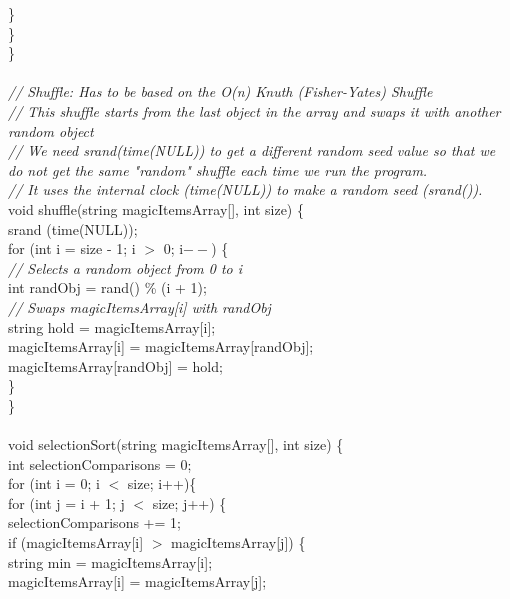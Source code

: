 \documentclass{article}
\begin{document}
\begin {linenumbers}
        \indent \indent \}\\
    \indent \}\\
\}\\
\\
\textit{// Shuffle: Has to be based on the O(n) Knuth (Fisher-Yates) Shuffle\\
// This shuffle starts from the last object in the array and swaps it with another random object\\
// We need srand(time(NULL)) to get a different random seed value so that we do not get the same "random" shuffle each time we run the program. \\
// It uses the internal clock (time(NULL)) to make a random seed (srand()).\\}
void shuffle(string magicItemsArray[], int size) \{\\
    \indent srand (time(NULL));\\
    \indent for (int i = size - 1; i $>$ 0; i$--$) \{\\
        \textit{\indent \indent // Selects a random object from 0 to i\\}
        \indent \indent int randObj = rand() \% (i + 1);\\
        \textit{\indent \indent // Swaps magicItemsArray[i] with randObj\\}
        \indent \indent string hold = magicItemsArray[i];\\
        \indent \indent magicItemsArray[i] = magicItemsArray[randObj];\\
        \indent \indent magicItemsArray[randObj] = hold;\\
    \indent \}\\
\}\\
\\
void selectionSort(string magicItemsArray[], int size) \{\\
    \indent int selectionComparisons = 0;\\
    \indent for (int i = 0; i $<$ size; i++)\{\\
        \indent \indent for (int j = i + 1; j $<$ size; j++) \{\\
            \indent \indent \indent selectionComparisons += 1;\\
            \indent \indent \indent if (magicItemsArray[i] $>$ magicItemsArray[j]) \{\\
                \indent \indent \indent \indent string min = magicItemsArray[i];\\
                \indent \indent \indent \indent magicItemsArray[i] = magicItemsArray[j];\\

\end{linenumbers}
\end{document}
